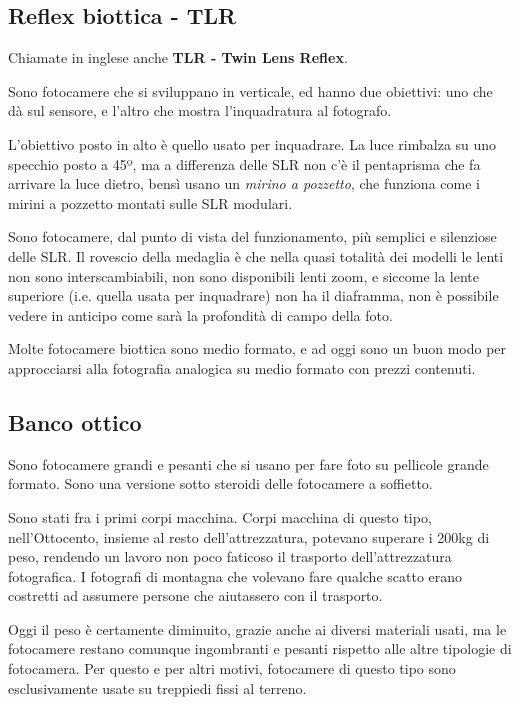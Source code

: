 \subsection{Reflex biottica - TLR} \label{subsec:tlr}
Chiamate in inglese anche \textbf{TLR - Twin Lens Reflex}.

Sono fotocamere che si sviluppano in verticale, ed hanno due obiettivi: uno che dà sul sensore, e l'altro che mostra l'inquadratura al fotografo.

L'obiettivo posto in alto è quello usato per inquadrare. La luce rimbalza su uno specchio posto a 45º, ma a differenza delle SLR non c'è il pentaprisma che fa arrivare la luce dietro, bensì usano un \textit{mirino a pozzetto}, che funziona come i mirini a pozzetto montati sulle SLR modulari.

Sono fotocamere, dal punto di vista del funzionamento, più semplici e silenziose delle SLR. Il rovescio della medaglia è che nella quasi totalità dei modelli le lenti non sono interscambiabili, non sono disponibili lenti zoom, e siccome la lente superiore (i.e. quella usata per inquadrare) non ha il diaframma, non è possibile vedere in anticipo come sarà la profondità di campo della foto.

Molte fotocamere biottica sono medio formato, e ad oggi sono un buon modo per approcciarsi alla fotografia analogica su medio formato con prezzi contenuti.


\subsection{Banco ottico} \label{subsec:bancoottico}
Sono fotocamere grandi e pesanti che si usano per fare foto su pellicole grande formato. Sono una versione sotto steroidi delle fotocamere a soffietto.

Sono stati fra i primi corpi macchina. Corpi macchina di questo tipo, nell'Ottocento, insieme al resto dell'attrezzatura, potevano superare i 200kg di peso, rendendo un lavoro non poco faticoso il trasporto dell'attrezzatura fotografica.
I fotografi di montagna che volevano fare qualche scatto erano costretti ad assumere persone che aiutassero con il trasporto.

Oggi il peso è certamente diminuito, grazie anche ai diversi materiali usati, ma le fotocamere restano comunque ingombranti e pesanti rispetto alle altre tipologie di fotocamera.
Per questo e per altri motivi, fotocamere di questo tipo sono esclusivamente usate su treppiedi fissi al terreno.

